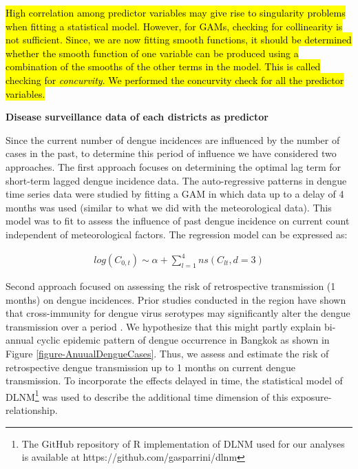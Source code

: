 \documentclass{bmcart}
\begin{document}
\hl{High correlation among predictor variables may give rise to singularity problems when fitting a statistical model. However, for GAMs, checking for collinearity is not sufficient. Since, we are now fitting smooth functions, it should be determined whether the smooth function of one variable can be produced using a combination of the smooths of the other terms in the model. This is called checking for \textit{concurvity}. We performed the concurvity check for all the predictor variables.}

\textbf{Disease surveillance data of each districts as predictor}

Since the current number of dengue incidences are influenced by the number of cases in the past, to determine this period of influence we have considered two approaches. The first approach focuses on determining the optimal lag term for short-term lagged dengue incidence data. The auto-regressive patterns in dengue time series data were studied by fitting a GAM in which data up to a delay of 4 months was used (similar to what we did with the meteorological data). This model was to fit to assess the influence of past dengue incidence on current count independent of meteorological factors. The regression model can be expressed as:

\begin{equation}
\begin{aligned}
\label{eq:short}
log (C_{0,t}) \sim \alpha + \sum_{l=1}^{4} ns(C_ {lt}, d =3) 
\end{aligned}
\end{equation}

Second approach focused on assessing the risk of retrospective transmission (1 months) on dengue incidences. Prior studies conducted in the region have shown that cross-immunity for dengue virus serotypes may significantly alter the dengue transmission over a period \cite{adams2006cross,reich2013interactions}. We hypothesize that this might partly explain bi-annual cyclic epidemic pattern of dengue occurrence in Bangkok as shown in Figure \ref{figure-AnuualDengueCases}. Thus, we assess and estimate the risk of retrospective dengue transmission up to 1 months on current dengue transmission. To incorporate the effects delayed in time, the statistical model of DLNM\footnote{The GitHub repository of R implementation of DLNM used for our analyses is available at https://github.com/gasparrini/dlnm} was used to describe the additional time dimension of this exposure-relationship\cite{gasparrini2010distributed}. 
\end{document}
